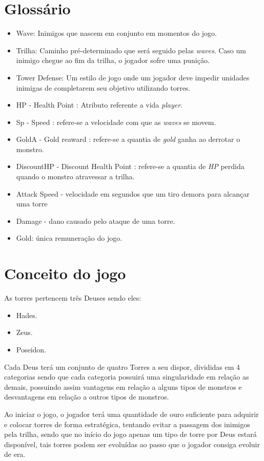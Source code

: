 \documentclass[11pt]{article} %
\begin{document}
\section{Glossário}
\begin{itemize}
\item Wave: Inimigos que nascem em conjunto em momentos do jogo.
\item Trilha: Caminho pré-determinado que será seguido pelas \textit{waves}. Caso um inimigo chegue ao fim da trilha, o jogador sofre uma punição.
\item Tower Defense: Um estilo de jogo onde um jogador deve impedir unidades inimigas de completarem seu objetivo utilizando torres.
\item HP - Health Point : Atributo referente a vida \textit{player}.
\item Sp - Speed : refere-se a velocidade com que as \textit{waves} se movem.
\item GoldA - Gold reaward  : refere-se a quantia de \textit{gold} ganha ao derrotar o monstro.
\item DiscountHP - Discount Health Point : refere-se a quantia de \textit{HP} perdida quando o monstro atravessar a trilha.
\item Attack Speed - velocidade em segundos que um tiro demora para alcançar uma torre
\item Damage - dano causado pelo ataque de uma torre.
\item Gold: única remuneração do jogo.
\end{itemize} 
 
\section{Conceito do jogo}

As torres pertencem  três Deuses sendo eles:
\begin{itemize}
\item Hades.
\item Zeus.
\item Poseidon.
\end{itemize}

Cada Deus terá um conjunto de quatro Torres a seu dispor, divididas em 4 categorias sendo que cada categoria possuirá uma singularidade em relação as demais, possuindo assim vantagens em relação a alguns tipos de monstros e desvantagens em relação a outros tipos de monstros.

Ao iniciar o jogo, o jogador terá uma quantidade de ouro suficiente para adquirir e colocar torres de forma estratégica, tentando evitar a passagem dos inimigos pela trilha, sendo que no início do jogo apenas um tipo de torre por Deus estará disponível, tais torres podem ser evoluídas ao passo que o jogador consiga evoluir de era. 
\end{document}

